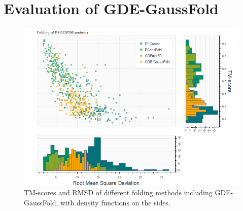 \section{Evaluation of GDE-GaussFold}

    \begin{figure}[H]
      \begin{center}
        \includegraphics[width=\textwidth, keepaspectratio]{imgs/gde.png}
         \caption{TM-scores and RMSD of different folding methods including
         GDE-GaussFold, with density functions on the sides.}
        \label{gde_results}
      \end{center}
    \end{figure}

